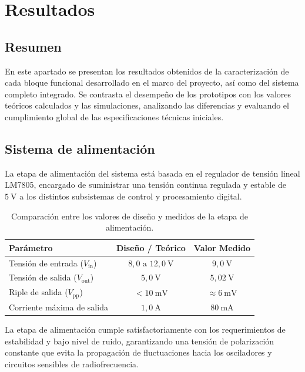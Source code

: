 \chapter*{Resultados}
\section*{Resumen}
En este apartado se presentan los resultados obtenidos de la caracterización de cada bloque funcional desarrollado en el marco del proyecto, así como del sistema completo integrado. Se contrasta el desempeño de los prototipos con los valores teóricos calculados y las simulaciones, analizando las diferencias y evaluando el cumplimiento global de las especificaciones técnicas iniciales.

\section*{Sistema de alimentación}

La etapa de alimentación del sistema está basada en el regulador de tensión lineal LM7805, encargado de suministrar una tensión continua regulada y estable de $5~\mathrm{V}$ a los distintos subsistemas de control y procesamiento digital.


\begin{table}[H]
\centering
\begin{tabular}{lcc}
\hline
\textbf{Parámetro} & \textbf{Diseño / Teórico} & \textbf{Valor Medido} \\
\hline
Tensión de entrada ($V_{\text{in}}$) & $8{,}0\text{ a }12{,}0~\mathrm{V}$ & $9{,}0~\mathrm{V}$ \\
Tensión de salida ($V_{\text{out}}$) & $5{,}0~\mathrm{V}$ & $5{,}02~\mathrm{V}$ \\

Riple de salida ($V_{\text{pp}}$) & $< 10~\mathrm{mV}$ & $\approx 6~\mathrm{mV}$ \\
Corriente máxima de salida & $1{,}0~\mathrm{A}$ & $80~\mathrm{mA}$ \\
\hline
\end{tabular}
\caption{Comparación entre los valores de diseño y medidos de la etapa de alimentación.}
\label{tab:resultados_alimentacion}
\end{table}

La etapa de alimentación cumple satisfactoriamente con los requerimientos de estabilidad y bajo nivel de ruido, garantizando una tensión de polarización constante que evita la propagación de fluctuaciones hacia los osciladores y circuitos sensibles de radiofrecuencia.

